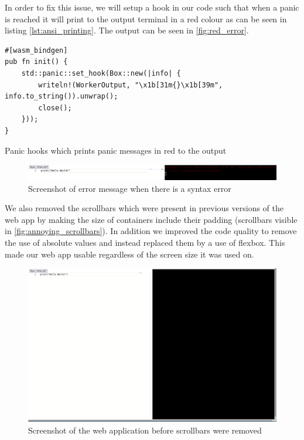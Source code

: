 \documentclass{article}
\begin{document}
In order to fix this issue, we will setup a hook in our code such that when a
panic is reached it will print to the output terminal in a red colour as can be
seen in listing \ref{lst:ansi_printing}. The output can be seen in
\autoref{fig:red_error}.

\begin{listing}
	\begin{verbatim}
#[wasm_bindgen]
pub fn init() {
    std::panic::set_hook(Box::new(|info| {
        writeln!(WorkerOutput, "\x1b[31m{}\x1b[39m", info.to_string()).unwrap();
        close();
    }));
}
	\end{verbatim}
	\caption{Panic hooks which prints panic messages in red to the output}
	\label{lst:ansi_printing}
\end{listing}

\begin{figure}
	\includegraphics[width=\textwidth]{red_error}
	\caption{Screenshot of error message when there is a syntax error}
	\label{fig:red_error}
\end{figure}

We also removed the scrollbars which were present in previous versions of the
web app by making the size of containers include their padding (scrollbars
visible in \autoref{fig:annoying_scrollbars}). In addition we improved the
code quality to remove the use of absolute values and instead replaced them by
a use of flexbox. This made our web app usable regardless of the screen size it
was used on.

\begin{figure}
	\includegraphics[width=\textwidth]{annoying_scrollbars}
	\caption{Screenshot of the web application before scrollbars were removed}
	\label{fig:annoying_scrollbars}
\end{figure}
\end{document}
